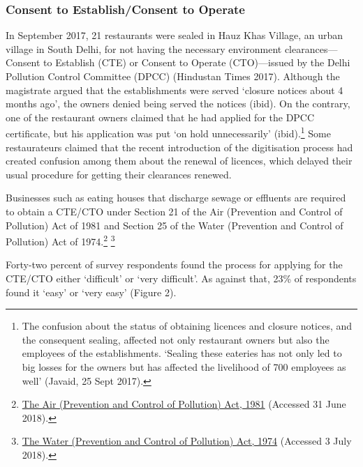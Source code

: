 \documentclass[a4paper, 12pt]{article}
\begin{document}
     
                  
                   \subsubsection{Consent to Establish/Consent to Operate}
                   In September 2017, 21 restaurants were sealed in Hauz Khas Village, an urban village in South Delhi, for not having the necessary environment clearances—Consent to Establish (CTE) or Consent to Operate (CTO)—issued by the Delhi Pollution Control Committee (DPCC) (Hindustan Times 2017). Although the magistrate argued that the establishments were served ‘closure notices about 4 months ago’, the owners denied being served the notices (ibid). On the contrary, one of the restaurant owners claimed that he had applied for the DPCC certificate, but his application was put ‘on hold unnecessarily’ (ibid).\footnote{The confusion about the status of obtaining licences and closure notices, and the consequent sealing, affected not only restaurant owners but also the employees of the establishments. ‘Sealing these eateries has not only led to big losses for the owners but has affected the livelihood of 700 employees as well’ (Javaid, 25 Sept 2017).} Some restaurateurs claimed that the recent introduction of the digitisation process had created confusion among them about the renewal of licences, which delayed their usual procedure for getting their clearances renewed.
                   
                   Businesses such as eating houses that discharge sewage or effluents are required to obtain a CTE/CTO under Section 21 of the Air (Prevention and Control of Pollution) Act of 1981 and Section 25 of the Water (Prevention and Control of Pollution) Act of 1974.\footnote{\href{https://bit.ly/2pbaWOw}{The Air (Prevention and Control of Pollution) Act, 1981} (Accessed 31 June 2018).} \footnote{\href{https://bit.ly/2xcUyRW}{The Water (Prevention and Control of Pollution) Act, 1974} (Accessed 3 July 2018).}  %
                   
                   Forty-two percent of survey respondents found the process for applying for the CTE/CTO either ‘difficult’ or ‘very difficult’. As against that, 23\% of respondents found it ‘easy’ or ‘very easy’ (Figure 2).
              
\end{document}
